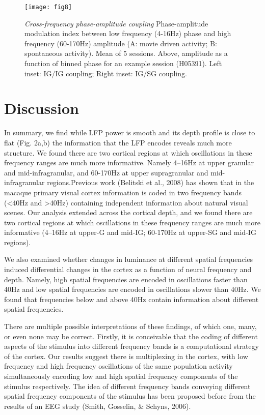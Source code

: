 \begin{figure}[htbp]
\centering \texttt{[image: fig8]}
%
\caption{%
\textit{Cross-frequency phase-amplitude coupling}
Phase-amplitude modulation index between low frequency (4-16Hz) phase and high 
frequency (60-170Hz) amplitude (A: movie driven activity; B: spontaneous 
activity). Mean of 5 sessions.
Above, amplitude as a function of binned phase for an example session (H05391). 
Left inset: \ac{IG}/\ac{IG} coupling; Right inset: \ac{IG}/\ac{SG} coupling.}%
\label{fig:lam_8}
%
\end{figure}

\section{Discussion}
In summary, we find while \ac{LFP} power is smooth and its depth profile is close to flat (Fig. 2a,b) the information that the \ac{LFP} encodes reveals much more structure. We found there are two cortical regions at which oscillations in these frequency ranges are much more informative. Namely 4--16Hz at upper granular and mid-infragranular, and 60-170Hz at upper supragranular and mid{}-infragranular regions.Previous work (Belitski et al., 2008) has shown that in the macaque primary visual cortex information is coded in two frequency bands ({\textless}40Hz and {\textgreater}40Hz) containing independent information about natural visual scenes. Our analysis extended across the cortical depth, and we found there are two cortical regions at which oscillations in these frequency ranges are much more informative (4--16Hz at upper-\ac{G} and mid-\ac{IG}; 60-170Hz at upper-\ac{SG} and mid-\ac{IG} regions).

We also examined whether changes in luminance at different spatial frequencies induced differential changes in the cortex as a function of neural frequency and depth. Namely, high spatial frequencies are encoded in oscillations faster than 40Hz and low spatial frequencies are encoded in oscillations slower than 40Hz. We found that frequencies below and above 40Hz contain information about different spatial frequencies.

There are multiple possible interpretations of these findings, of which one, many, or even none may be correct. Firstly, it is conceivable that the coding of different aspects of the stimulus into different frequency bands is a computational strategy of the cortex. Our results suggest there is multiplexing in the cortex, with low frequency and high frequency oscillations of the same population activity simultaneously encoding low and high spatial frequency components of the stimulus respectively. The idea of different frequency bands conveying different spatial frequency components of the stimulus has been proposed before from the results of an \ac{EEG} study (Smith, Gosselin, \& Schyns, 2006).

